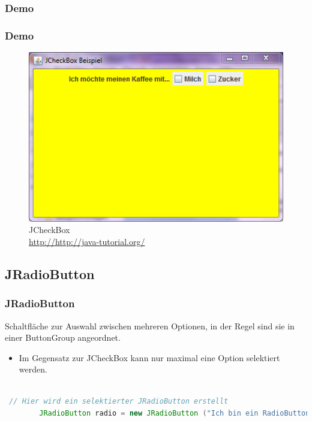 \documentclass[xcolor=dvipsnames]{beamer}
\begin{document}
\subsubsection{Demo}
\begin{frame}
  \frametitle{Demo}
	\begin{figure}
		\includegraphics[scale=0.8]{images/jcheckbox.PNG}
		\caption{JCheckBox \\ \tiny{\textcolor{gray}{\url{http://http://java-tutorial.org/}}}}
		\end{figure}
\end{frame}


\subsection{JRadioButton}
\begin{frame}  %
  \frametitle{JRadioButton} %
  \begin{block}{Schaltfläche zur Auswahl zwischen mehreren Optionen, in der Regel sind sie in einer ButtonGroup angeordnet. }
	  \begin{itemize}
		\item Im Gegensatz zur JCheckBox kann nur maximal eine Option selektiert werden.
	  \end{itemize}
  \end{block}

\begin{lstlisting}[language=java,basicstyle=\scriptsize\ttfamily]

 // Hier wird ein selektierter JRadioButton erstellt
        JRadioButton radio = new JRadioButton ("Ich bin ein RadioButton", true);

\end{lstlisting}

\end{frame}
\end{document}
